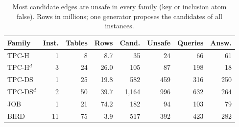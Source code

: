 \begin{table}[t]
\centering
\caption{Most candidate edges are unsafe in every family (key or inclusion atom false). Rows in millions; one generator proposes the candidates of all instances.}
\label{tab:data}
\small
\setlength{\tabcolsep}{3.2pt}
\begin{tabular}{@{}lrrrrrrr@{}}
\toprule
Family & Inst. & Tables & Rows & Cand. & Unsafe & Queries & Answ. \\
\midrule
TPC-H & 1 & 8 & 8.7 & 35 & 24 & 66 & 61 \\
TPC-H$^d$ & 3 & 24 & 26.0 & 105 & 87 & 198 & 18 \\
TPC-DS & 1 & 25 & 19.8 & 582 & 459 & 316 & 250 \\
TPC-DS$^d$ & 2 & 50 & 39.7 & 1,164 & 996 & 632 & 264 \\
JOB & 1 & 21 & 74.2 & 182 & 94 & 103 & 79 \\
BIRD & 11 & 75 & 3.9 & 517 & 392 & 423 & 282 \\
\bottomrule
\end{tabular}
\end{table}
